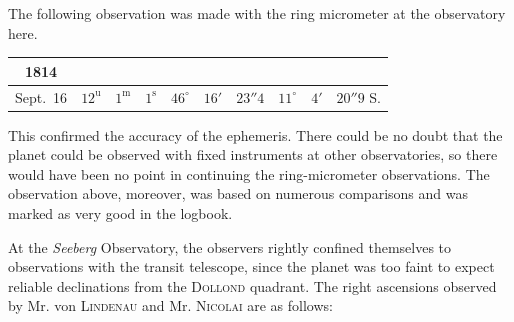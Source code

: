 \par\indent The following observation was made with the ring micrometer at the observatory here.

\begin{center}\fontsize{9}{11}\selectfont\setlength{\tabcolsep}{3pt}\renewcommand{\arraystretch}{1.15}\begin{tabular}{c|ccc|ccc|ccc}
1814 &  &  &  \\
\hline
Sept.\ 16 & $12^{\mathrm u}$ & $1^{\mathrm m}$ & $1^{\mathrm s}$ & $46^{\circ}$ & $16'$ & $23''4$ & $11^{\circ}$ & $4'$ & $20''9$ S. \\
\end{tabular}\end{center}

\par\indent This confirmed the accuracy of the ephemeris. There could be no doubt that the planet could be observed with fixed instruments at other observatories, so there would have been no point in continuing the ring-micrometer observations. The observation above, moreover, was based on numerous comparisons and was marked as very good in the logbook.

\par\indent At the \emph{Seeberg} Observatory, the observers rightly confined themselves to observations with the transit telescope, since the planet was too faint to expect reliable declinations from the \textsc{Dollond} quadrant. The right ascensions observed by Mr. von \textsc{Lindenau} and Mr. \textsc{Nicolai} are as follows:

